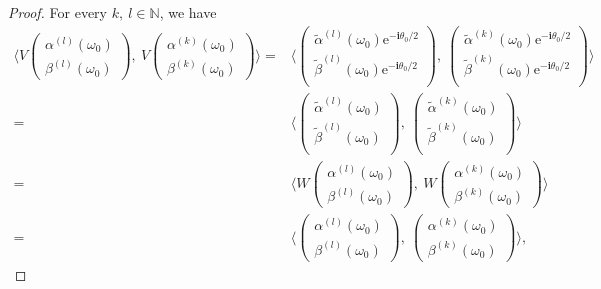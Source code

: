 \documentclass[10pt,a4paper]{amsart}
\begin{document}
\begin{proof}
  For every $k,\ l\in\mathbb{N}$, we have
     \begin{equation*}
 	\begin{aligned}
 		\langle V
 		\begin{pmatrix}
 			\alpha^{(l)}(\omega_0) \\
 			\beta^{(l)}(\omega_0)
 		\end{pmatrix},\
 		V
 		\begin{pmatrix}
 			\alpha^{(k)}(\omega_0) \\
 			\beta^{(k)}(\omega_0)
 		\end{pmatrix}
 		\rangle
 		= & \langle
 		\begin{pmatrix}
 			\widetilde{\alpha}^{(l)}(\omega_0)\mathrm{e}^{-\boldsymbol{i}\theta_0/2} \\
 			\widetilde{\beta}^{(l)}(\omega_0)\mathrm{e}^{-\boldsymbol{i}\theta_0/2} \\
 		\end{pmatrix},\
 		\begin{pmatrix}
 			\widetilde{\alpha}^{(k)}(\omega_0)\mathrm{e}^{-\boldsymbol{i}\theta_0/2} \\
 			\widetilde{\beta}^{(k)}(\omega_0)\mathrm{e}^{-\boldsymbol{i}\theta_0/2} \\
 		\end{pmatrix}
 		\rangle \\
 		= &
 		\langle
 		\begin{pmatrix}
 			\widetilde{\alpha}^{(l)}(\omega_0) \\
 			\widetilde{\beta}^{(l)}(\omega_0)\\
 		\end{pmatrix},\
 		\begin{pmatrix}
 			\widetilde{\alpha}^{(k)}(\omega_0) \\
 			\widetilde{\beta}^{(k)}(\omega_0) \\
 		\end{pmatrix}
 		\rangle \\
 		= & \langle
 		W\begin{pmatrix}
 			\alpha^{(l)}(\omega_0) \\
 			\beta^{(l)}(\omega_0)
 		\end{pmatrix},\
 		W\begin{pmatrix}
 			\alpha^{(k)}(\omega_0) \\
 			\beta^{(k)}(\omega_0)
 		\end{pmatrix}
 		\rangle \\
 		= & \langle
 		\begin{pmatrix}
 			\alpha^{(l)}(\omega_0) \\
 			\beta^{(l)}(\omega_0)
 		\end{pmatrix},\
 		\begin{pmatrix}
 			\alpha^{(k)}(\omega_0) \\
 			\beta^{(k)}(\omega_0)
 		\end{pmatrix}
 		\rangle,
 	\end{aligned}
 \end{equation*}


\end{proof}
\end{document}
